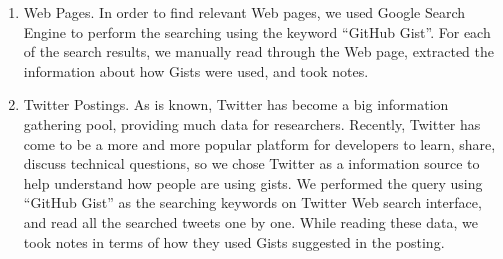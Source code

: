 \begin{enumerate}
	\item Web Pages. In order to find relevant Web pages, we used Google Search Engine to perform the searching using the keyword ``GitHub Gist''. For each of the search results, we manually read through the Web page, extracted the information about how Gists were used, and took notes.

	\item Twitter Postings. As is known, Twitter has become a big information gathering pool, providing much data for researchers. Recently, Twitter has come to be a more and more popular platform for developers to learn, share, discuss technical questions, so we chose Twitter as a information source to help understand how people are using gists. We performed the query using ``GitHub Gist'' as the searching keywords on Twitter Web search interface, and read all the searched tweets one by one. While reading these data, we took notes in terms of how they used Gists suggested in the posting. 
\end{enumerate}